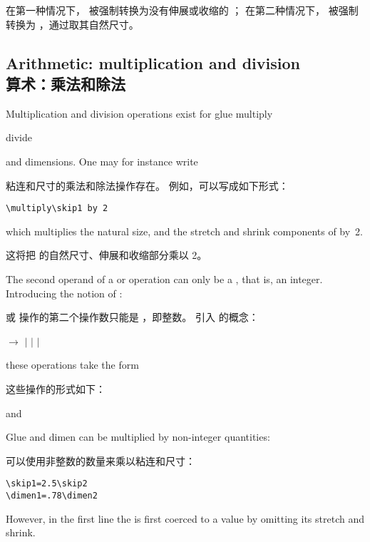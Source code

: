 在第一种情况下， 被强制转换为没有伸展或收缩的 ；
在第二种情况下， 被强制转换为 ，通过取其自然尺寸。



\subsection{Arithmetic: multiplication and division\\算术：乘法和除法}

Multiplication and division operations exist for glue
\cstoidx multiply\par\cstoidx divide\par
and dimensions. One may for instance write

粘连和尺寸的乘法和除法操作存在。
例如，可以写成如下形式：
\begin{verbatim}
\multiply\skip1 by 2
\end{verbatim}
which multiplies the natural size, and the stretch and shrink
components of  by~2.

这将把  的自然尺寸、伸展和收缩部分乘以 2。

The second operand of a  or 
operation can only be a , that is, an integer.
Introducing the notion of :

 或  操作的第二个操作数只能是 ，即整数。
引入  的概念：
\begin{disp} $\longrightarrow$ 
     $|$  \nl
     \indent $|$  $|$ \end{disp}
these operations take the form

这些操作的形式如下：
\begin{Disp}%
\end{Disp} 
and
\begin{Disp}%
\end{Disp}

Glue and dimen can be multiplied by 
non-integer quantities:

可以使用非整数的数量来乘以粘连和尺寸：
\begin{verbatim}
\skip1=2.5\skip2
\dimen1=.78\dimen2
\end{verbatim}
However, in the first line the  is first coerced
to a  value by omitting its stretch and shrink.

